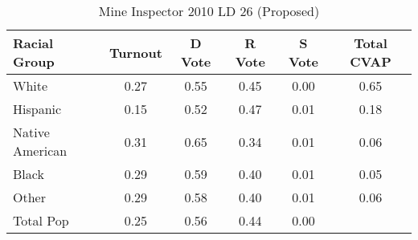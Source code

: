 \begin{table}[htb]
\begin{center}
\caption{Mine Inspector 2010 LD 26 (Proposed)}
\label{smine_cvap_ld_26}
\begin{tabular}{lccccc}
  \hline
Racial Group & Turnout & D Vote & R Vote & S Vote & Total CVAP \\ 
  \hline
White & 0.27 & 0.55 & 0.45 & 0.00 & 0.65 \\ 
  Hispanic & 0.15 & 0.52 & 0.47 & 0.01 & 0.18 \\ 
  Native American & 0.31 & 0.65 & 0.34 & 0.01 & 0.06 \\ 
  Black & 0.29 & 0.59 & 0.40 & 0.01 & 0.05 \\ 
  Other & 0.29 & 0.58 & 0.40 & 0.01 & 0.06 \\ 
  Total Pop & 0.25 & 0.56 & 0.44 & 0.00 &  \\ 
   \hline
\end{tabular}
\end{center}
\end{table}

